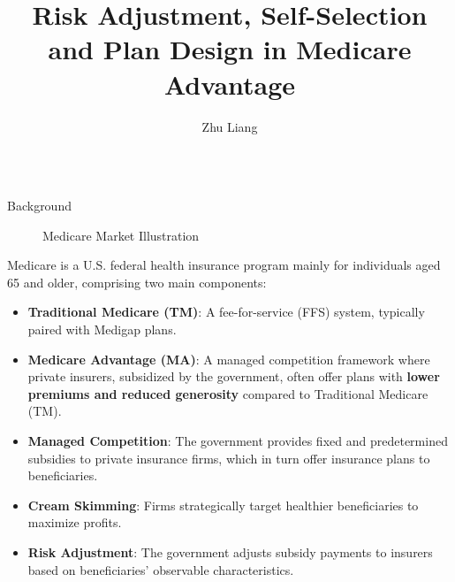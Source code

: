 \documentclass{beamer}
\title{Risk Adjustment, Self-Selection and Plan Design in Medicare Advantage}
\author{ Zhu Liang}
\institute{ Stony Brook University}
\begin{document}
\begin{frame}[t]
  \linespread{1.2}\selectfont
  \begin{columns}[t]
    \begin{column}{.45\textwidth}
      \begin{block}{Background}
        \begin{figure}[ht]
          \centering
          \scriptsize
          \resizebox{0.5\linewidth}{!}{%
          
        }
          \caption{Medicare Market Illustration}
        \end{figure}
        Medicare is a U.S. federal health insurance program mainly for individuals aged 65 and older, comprising two main components:
        \begin{itemize}
          \item \textbf{Traditional Medicare (TM)}: A fee-for-service (FFS) system, typically paired with Medigap plans.
          \item \textbf{Medicare Advantage (MA)}: A managed competition framework where private insurers, subsidized by the government, often offer plans with \textbf{lower premiums and reduced generosity} compared to Traditional Medicare (TM).
        \end{itemize}
        \begin{itemize}
          \item \textbf{Managed Competition}: The government provides fixed and predetermined subsidies to private insurance firms, which in turn offer insurance plans to beneficiaries.
          \item \textbf{Cream Skimming}: Firms strategically target healthier beneficiaries to maximize profits.
          \item \textbf{Risk Adjustment}: The government adjusts subsidy payments to insurers based on beneficiaries' observable characteristics.
        \end{itemize}
      \end{block}


\end{column}
\end{columns}
\end{frame}
\end{document}
